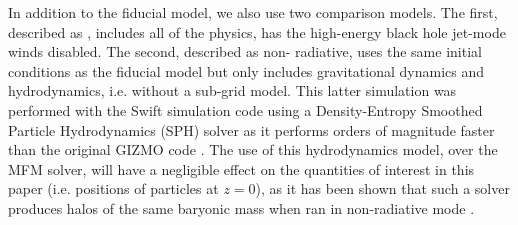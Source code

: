 In addition to the fiducial model, we also use two comparison models. The
first, described as \nojet{}, includes all of the \simba{} physics, has the
high-energy black hole jet-mode winds disabled. The second, described as non-
radiative, uses the same initial conditions as the fiducial model but only
includes gravitational dynamics and hydrodynamics, i.e. without a sub-grid
model. This latter simulation was performed with the {\sc Swift} simulation
code \citep{Schaller2016} using a Density-Entropy Smoothed Particle
Hydrodynamics (SPH) solver as it performs orders of magnitude faster than the
original GIZMO code \citep{Borrow2018}. The use of this hydrodynamics model,
over the MFM solver, will have a negligible effect on the quantities of
interest in this paper (i.e. positions of particles at $z=0$), as it has been
shown that such a solver produces halos of the same baryonic mass when ran in
non-radiative mode \citep[see e.g.][]{Sembolini2016}.
